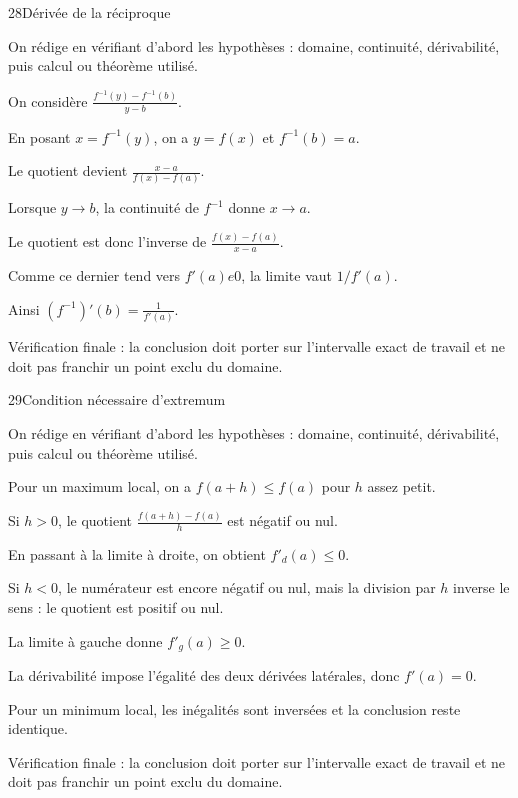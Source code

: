 \documentclass[11pt,a4paper]{article}
\begin{document}
\begin{corrbox}{28}{Dérivée de la réciproque}

\begin{methodebox}
On rédige en vérifiant d'abord les hypothèses : domaine, continuité, dérivabilité, puis calcul ou théorème utilisé.
\end{methodebox}

On considère $\frac{f^{-1}(y)-f^{-1}(b)}{y-b}$.


En posant $x=f^{-1}(y)$, on a $y=f(x)$ et $f^{-1}(b)=a$.


Le quotient devient $\frac{x-a}{f(x)-f(a)}$.


Lorsque $y\to b$, la continuité de $f^{-1}$ donne $x\to a$.


Le quotient est donc l'inverse de $\frac{f(x)-f(a)}{x-a}$.


Comme ce dernier tend vers $f'(a)
e0$, la limite vaut $1/f'(a)$.


Ainsi $(f^{-1})'(b)=\frac1{f'(a)}$.


\begin{attentionbox}
Vérification finale : la conclusion doit porter sur l'intervalle exact de travail et ne doit pas franchir un point exclu du domaine.
\end{attentionbox}

\end{corrbox}


\begin{corrbox}{29}{Condition nécessaire d'extremum}

\begin{methodebox}
On rédige en vérifiant d'abord les hypothèses : domaine, continuité, dérivabilité, puis calcul ou théorème utilisé.
\end{methodebox}

Pour un maximum local, on a $f(a+h)\le f(a)$ pour $h$ assez petit.


Si $h>0$, le quotient $\frac{f(a+h)-f(a)}h$ est négatif ou nul.


En passant à la limite à droite, on obtient $f'_d(a)\le0$.


Si $h<0$, le numérateur est encore négatif ou nul, mais la division par $h$ inverse le sens : le quotient est positif ou nul.


La limite à gauche donne $f'_g(a)\ge0$.


La dérivabilité impose l'égalité des deux dérivées latérales, donc $f'(a)=0$.


Pour un minimum local, les inégalités sont inversées et la conclusion reste identique.


\begin{attentionbox}
Vérification finale : la conclusion doit porter sur l'intervalle exact de travail et ne doit pas franchir un point exclu du domaine.
\end{attentionbox}

\end{corrbox}
\end{document}
